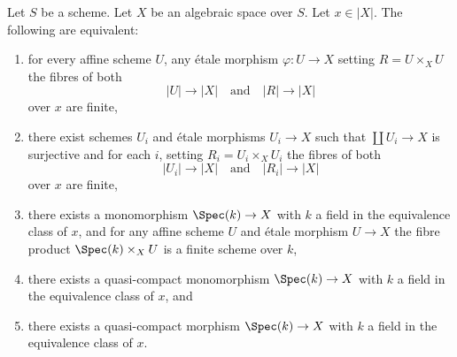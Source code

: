 \begin{lemma}
\label{lemma-UR-finite-above-x}
Let $S$ be a scheme. Let $X$ be an algebraic space over $S$.
Let $x \in |X|$. The following are equivalent:
\begin{enumerate}
\item for every affine scheme $U$, any \'etale morphism
$\varphi : U \to X$ setting $R = U \times_X U$ the fibres of both
$$
|U| \longrightarrow |X|
\quad\text{and}\quad
|R| \longrightarrow |X|
$$
over $x$ are finite,
\item there exist schemes $U_i$ and \'etale morphisms
$U_i \to X$ such that $\coprod U_i \to X$ is surjective and for each
$i$, setting $R_i = U_i \times_X U_i$ the fibres of both
$$
|U_i| \longrightarrow |X|
\quad\text{and}\quad
|R_i| \longrightarrow |X|
$$
over $x$ are finite,
\item there exists a monomorphism $\Spec(k) \to X$ with $k$ a field
in the equivalence class of $x$, and for any affine scheme $U$ and \'etale
morphism $U \to X$ the fibre product $\Spec(k) \times_X U$ is
a finite scheme over $k$,
\item there exists a quasi-compact monomorphism $\Spec(k) \to X$
with $k$ a field in the equivalence class of $x$, and
\item there exists a quasi-compact morphism $\Spec(k) \to X$
with $k$ a field in the equivalence class of $x$.
\end{enumerate}
\end{lemma}

